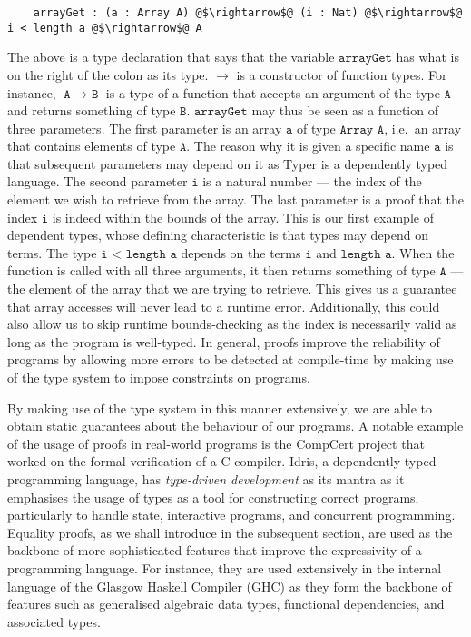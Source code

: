 \documentclass[12pt,twoside,maitrise]{dms}
\theoremstyle{definition}
\numberwithin{equation}{section}
\numberwithin{table}{chapter}
\numberwithin{figure}{chapter}
\newcommand\id[1] {\texttt{#1}}
\newcommand\fn[1] {\texttt{#1}}
\begin{document}
\begin{verbatim}
    arrayGet : (a : Array A) @$\rightarrow$@ (i : Nat) @$\rightarrow$@ i < length a @$\rightarrow$@ A
\end{verbatim}

The above is a type declaration that says that the variable $\fn{arrayGet}$ has
what is on the right of the colon as its type. $\rightarrow$ is a constructor of
function types. For instance, $\fn{A $\rightarrow$ B}$ is a type of a function
that accepts an argument of the type $\fn{A}$ and returns something of type
$\fn{B}$. $\fn{arrayGet}$ may thus be seen as a function of three parameters.
The first parameter is an array $\fn{a}$ of type $\fn{Array A}$, i.e.\ an array
that contains elements of type $\fn{A}$. The reason why it is given a specific
name $\fn{a}$ is that subsequent parameters may depend on it as Typer is a
dependently typed language. The second parameter $\fn{i}$ is a natural number
--- the index of the element we wish to retrieve from the array. The last
parameter is a proof that the index $\id{i}$ is indeed within the bounds of the
array. This is our first example of dependent types, whose defining
characteristic is that types may depend on terms. The type $\fn{i < length a}$
depends on the terms $\fn{i}$ and $\fn{length a}$. When the function is called
with all three arguments, it then returns something of type $\fn{A}$ --- the
element of the array that we are trying to retrieve. This gives us a guarantee
that array accesses will never lead to a runtime error. Additionally, this could
also allow us to skip runtime bounds-checking as the index is necessarily valid
as long as the program is well-typed. In general, proofs improve the reliability
of programs by allowing more errors to be detected at compile-time by making use
of the type system to impose constraints on programs.

By making use of the type system in this manner extensively, we are able to obtain
static guarantees about the behaviour of our programs. A notable example of the
usage of proofs in real-world programs is the CompCert project that worked on
the formal verification of a C compiler\cite{Leroy-Compcert-CACM}. Idris, a
dependently-typed programming language, has \emph{type-driven development} as
its mantra as it emphasises the usage of types as a tool for constructing
correct programs, particularly to handle state, interactive programs, and
concurrent programming. Equality proofs, as we shall introduce in the subsequent
section, are used as the backbone of more sophisticated features that improve
the expressivity of a programming language. For instance, they are used
extensively in the internal language of the Glasgow Haskell Compiler (GHC) as
they form the backbone of features such as generalised algebraic data types,
functional dependencies, and associated types\cite{sulzmann2007systemfeq}.
\end{document}
